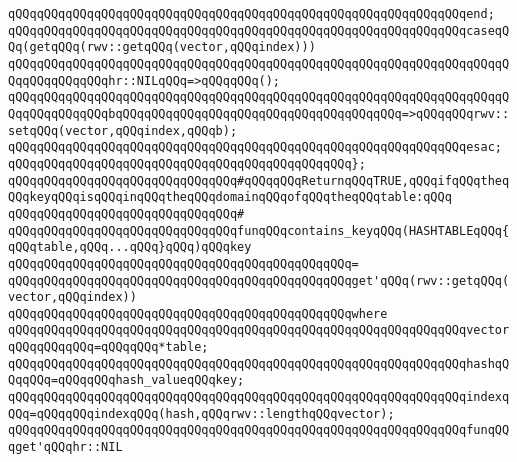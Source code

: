 \verb|qQQqqQQqqQQqqQQqqQQqqQQqqQQqqQQqqQQqqQQqqQQqqQQqqQQqqQQqqQQqqQQqend;|\newline
\newline
\verb|qQQqqQQqqQQqqQQqqQQqqQQqqQQqqQQqqQQqqQQqqQQqqQQqqQQqqQQqqQQqqQQqcaseqQQq(getqQQq(rwv::getqQQq(vector,qQQqindex)))|\newline
\newline
\verb|qQQqqQQqqQQqqQQqqQQqqQQqqQQqqQQqqQQqqQQqqQQqqQQqqQQqqQQqqQQqqQQqqQQqqQQqqQQqqQQqqQQqhr::NILqQQq=>qQQqqQQq();|\newline
\verb|qQQqqQQqqQQqqQQqqQQqqQQqqQQqqQQqqQQqqQQqqQQqqQQqqQQqqQQqqQQqqQQqqQQqqQQqqQQqqQQqqQQqbqQQqqQQqqQQqqQQqqQQqqQQqqQQqqQQqqQQqqQQq=>qQQqqQQqrwv::setqQQq(vector,qQQqindex,qQQqb);|\newline
\verb|qQQqqQQqqQQqqQQqqQQqqQQqqQQqqQQqqQQqqQQqqQQqqQQqqQQqqQQqqQQqqQQqesac;|\newline
\newline
\verb|qQQqqQQqqQQqqQQqqQQqqQQqqQQqqQQqqQQqqQQqqQQqqQQq};|\newline
\newline
\verb|qQQqqQQqqQQqqQQqqQQqqQQqqQQqqQQq#qQQqqQQqReturnqQQqTRUE,qQQqifqQQqtheqQQqkeyqQQqisqQQqinqQQqtheqQQqdomainqQQqofqQQqtheqQQqtable:qQQq|\newline
\verb|qQQqqQQqqQQqqQQqqQQqqQQqqQQqqQQq#|\newline
\verb|qQQqqQQqqQQqqQQqqQQqqQQqqQQqqQQqfunqQQqcontains_keyqQQq(HASHTABLEqQQq{qQQqtable,qQQq...qQQq}qQQq)qQQqkey|\newline
\verb|qQQqqQQqqQQqqQQqqQQqqQQqqQQqqQQqqQQqqQQqqQQqqQQq=|\newline
\verb|qQQqqQQqqQQqqQQqqQQqqQQqqQQqqQQqqQQqqQQqqQQqqQQqget'qQQq(rwv::getqQQq(vector,qQQqindex))|\newline
\verb|qQQqqQQqqQQqqQQqqQQqqQQqqQQqqQQqqQQqqQQqqQQqqQQqwhere|\newline
\verb|qQQqqQQqqQQqqQQqqQQqqQQqqQQqqQQqqQQqqQQqqQQqqQQqqQQqqQQqqQQqqQQqvectorqQQqqQQqqQQq=qQQqqQQq*table;|\newline
\verb|qQQqqQQqqQQqqQQqqQQqqQQqqQQqqQQqqQQqqQQqqQQqqQQqqQQqqQQqqQQqqQQqhashqQQqqQQq=qQQqqQQqhash_valueqQQqkey;|\newline
\newline
\verb|qQQqqQQqqQQqqQQqqQQqqQQqqQQqqQQqqQQqqQQqqQQqqQQqqQQqqQQqqQQqqQQqindexqQQq=qQQqqQQqindexqQQq(hash,qQQqrwv::lengthqQQqvector);|\newline
\newline
\verb|qQQqqQQqqQQqqQQqqQQqqQQqqQQqqQQqqQQqqQQqqQQqqQQqqQQqqQQqqQQqqQQqfunqQQqget'qQQqhr::NIL|\newline
